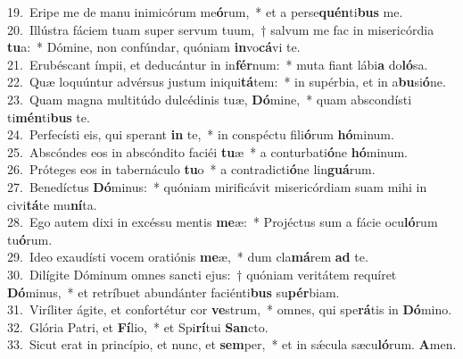 {19.~}Eripe me de manu inimicórum me\textbf{ó}rum,~* et a perse\textbf{quén}ti\textbf{bus} me.\\
{20.~}Illústra fáciem tuam super servum tuum,~† salvum me fac in misericórdia \textbf{tu}a:~* Dómine, non confúndar, quóniam \textbf{in}vo\textbf{cá}vi te.\\
{21.~}Erubéscant ímpii, et deducántur in in\textbf{fér}num:~* muta fiant lábi\textbf{a} do\textbf{ló}sa.\\
{22.~}Quæ loquúntur advérsus justum iniqui\textbf{tá}tem:~* in supérbia, et in a\textbf{bu}si\textbf{ó}ne.\\
{23.~}Quam magna multitúdo dulcédinis tuæ, \textbf{Dó}mine,~* quam abscondísti ti\textbf{mén}ti\textbf{bus} te.\\
{24.~}Perfecísti eis, qui sperant \textbf{in} te,~* in conspéctu fili\textbf{ó}rum \textbf{hó}minum.\\
{25.~}Abscóndes eos in abscóndito faciéi \textbf{tu}æ~* a conturbati\textbf{ó}ne \textbf{hó}minum.\\
{26.~}Próteges eos in tabernáculo \textbf{tu}o~* a contradicti\textbf{ó}ne lin\textbf{guá}rum.\\
{27.~}Benedíctus \textbf{Dó}minus:~* quóniam mirificávit misericórdiam suam mihi in civi\textbf{tá}te mu\textbf{ní}ta.\\
{28.~}Ego autem dixi in excéssu mentis \textbf{me}æ:~* Projéctus sum a fácie ocu\textbf{ló}rum tu\textbf{ó}rum.\\
{29.~}Ideo exaudísti vocem oratiónis \textbf{me}æ,~* dum cla\textbf{má}rem \textbf{ad} te.\\
{30.~}Dilígite Dóminum omnes sancti ejus:~† quóniam veritátem requíret \textbf{Dó}minus,~* et retríbuet abundánter faciénti\textbf{bus} su\textbf{pér}biam.\\
{31.~}Viríliter ágite, et confortétur cor \textbf{ve}strum,~* omnes, qui spe\textbf{rá}tis in \textbf{Dó}mino.\\
{32.~}Glória Patri, et \textbf{Fí}lio,~* et Spi\textbf{rí}tui \textbf{San}cto.\\
{33.~}Sicut erat in princípio, et nunc, et \textbf{sem}per,~* et in sǽcula sæcu\textbf{ló}rum. \textbf{A}men.\\
